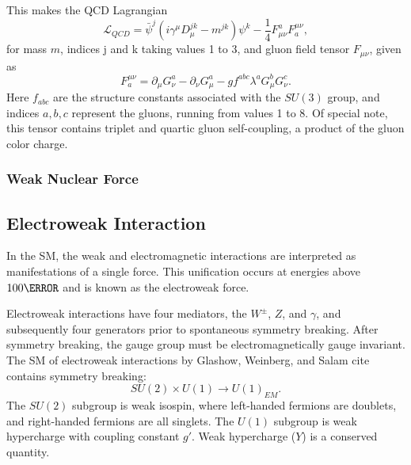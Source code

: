         This makes the \gls{QCD} Lagrangian
        \begin{equation}
            \mathcal{L}_{QCD} = \bar{\psi}^j (i \gamma^{\mu} D_{\mu}^{jk} - m^{jk})\psi^{k} - \frac{1}{4} F_{\mu \nu}^{a} F^{\mu \nu}_{a},
        \end{equation}
        for mass $m$, indices j and k taking values 1 to 3, and gluon field tensor $F_{\mu \nu}$, given as
        \begin{equation}
            F^{\mu \nu}_{a} = \partial_{\mu} G_{\nu}^a - \partial_{\nu}G_{\mu}^a - g f^{abc} \lambda^a G_{\mu}^b G_{\nu}^c.
        \end{equation}
        Here $f_{abc}$ are the structure constants associated with the $SU(3)$ group, and indices $a,b,c$ represent the gluons, running from values 1 to 8. Of special note, this tensor contains triplet and quartic gluon self-coupling, a product of the gluon color charge.


        \subsubsection{Weak Nuclear Force}

        \subsection{Electroweak Interaction}

        In the \gls{SM}, the weak and electromagnetic interactions are interpreted as manifestations of a single force. This unification occurs at energies above $\unit{100}{\GeV}$ and is known as the electroweak force.

        Electroweak interactions have four mediators, the $W^{\pm}$, $Z$, and $\gamma$, and subsequently four generators prior to spontaneous symmetry breaking. After symmetry breaking, the gauge group must be electromagnetically gauge invariant. The \gls{SM} of electroweak interactions by Glashow, Weinberg, and Salam {\color{red} cite} contains symmetry breaking:
        \begin{equation}
            SU(2) \times U(1) \rightarrow U(1)_{EM}.
        \end{equation}
        The $SU(2)$ subgroup is weak isospin, where left-handed fermions are doublets, and right-handed fermions are all singlets. The $U(1)$ subgroup is weak hypercharge with coupling constant $g'$. Weak hypercharge ($Y$) is a conserved quantity. 

